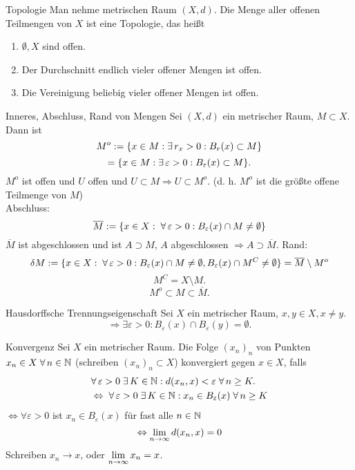 \documentclass[main.tex]{subfiles}
\begin{document}
\begin{karte}{Topologie}
    Man nehme metrischen Raum \( (X, d) \).
    Die Menge aller offenen Teilmengen von \(X\) 
    ist eine Topologie, das heißt
    \begin{enumerate}
        \item \( \emptyset, X \) sind offen.
        \item Der Durchschnitt endlich vieler
        offener Mengen ist offen.
        \item Die Vereinigung beliebig vieler offener
        Mengen ist offen. 
    \end{enumerate}
\end{karte}

\begin{karte}{Inneres, Abschluss, Rand von Mengen}
    Sei \( (X, d) \) ein metrischer Raum, \( M \subset X \).
    Dann ist 
    \[ M^o 
    := \set{x \in M: \exists r_x > 0: B_r(x)\subset M}\]
    \[= \set{x \in M: \exists \varepsilon > 0: 
    B_\varepsilon(x) \subset M }.\]
    \( M^o \) ist offen und \( U \) offen 
    und \( U \subset M \Rightarrow U \subset M^o \).
    (d. h. \( M^o \) ist die größte offene Teilmenge 
    von \(M\))\\
    Abschluss:
    \[ \overline{M} := 
    \set{x \in X: \; \forall \varepsilon > 0: 
    B_\varepsilon(x) \cap M \neq \emptyset} \]
    \( \overline{M} \) ist abgeschlossen und ist 
    \(A \supset M \), \( A \) abgeschlossen 
    \( \Rightarrow A \supset \overline{M}. \)
    Rand: 
    \[ \delta M := \set{ x \in X: \; \forall \varepsilon > 0: 
    B_\varepsilon(x) \cap M \neq \emptyset, 
    B_\varepsilon(x) \cap M^C \neq \emptyset } = \overline{M} \setminus M^o\]
    \[ M^C = X \setminus M. \]
    \[ M^o \subset M \subset \overline{M}. \]
\end{karte}

\begin{karte}{Hausdorffsche Trennungseigenschaft}
    Sei \( X \) ein metrischer Raum, 
    \( x,y \in X, x\neq y \). 
    \[ \Rightarrow \exists \varepsilon > 0: 
    B_\varepsilon(x) \cap B_\varepsilon(y) = \emptyset. \]
\end{karte}

\begin{karte}{Konvergenz}
    Sei \( X \) ein metrischer Raum. Die Folge 
    \( (x_n)_n \) von Punkten \( x_n \in X \; \forall n\in\N \)
    (schreiben \( (x_n)_n \subset X \)) konvergiert 
    gegen \( x \in X \), falls 
    \begin{align*}
        &\forall \varepsilon > 0 \; \exists K \in \N: 
        d(x_n, x) < \varepsilon \;\forall n \geq K. \\
        &\Leftrightarrow \; \forall \varepsilon > 0 
        \; \exists K \in \N: x_n \in B_\varepsilon(x) 
        \; \forall n \geq K 
    \end{align*}
    \( \Leftrightarrow \forall \varepsilon > 0  \) 
    ist \( x_n \in B_\varepsilon(x) \) für fast alle 
    \( n\in\mathbb{N} \)
    \[ \Leftrightarrow \lim\limits_{n\rightarrow\infty} d(x_n, x) = 0 \]
    Schreiben \( x_n \rightarrow x \), oder 
    \( \lim\limits_{n\rightarrow\infty} x_n = x \).
\end{karte}
\end{document}
